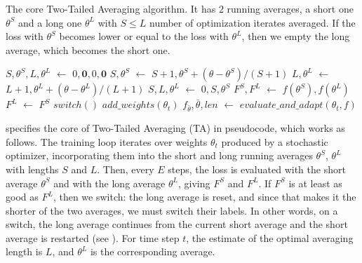 \documentclass[twocolumn]{article}
\newcommand*\Let[2]{\State #1 $\gets$ #2}
\newcommand{\tta}{\liningnums{2}TA}
\begin{document}
\begin{algorithm}[t]
  \caption[The core Two-Tailed Averaging algorithm, without extensions.]{\small The core Two-Tailed Averaging algorithm.
It has 2 running averages, a short one $\theta^S$ and a long one $\theta^L$ with $S \leq L$ number of optimization iterates averaged.
If the loss with $\theta^S$ becomes lower or equal to the loss with $\theta^L$, then we empty the long average, which becomes the short one.}
  \label{alg:two-tailed-averaging-core}
  \begin{algorithmic}[1]
    \Let{$S,\theta^S, L, \theta^L$} {$0, \mathbf{0}, 0, \mathbf{0}$}
    \State
      \Let{$S, \theta^S$}{$S+1,\theta^S + (\theta-\theta^S)/(S+1)$}
      \Let{$L, \theta^L$}{$L+1,\theta^L + (\theta-\theta^L)/(L+1)$}
    \EndProcedure
    \State
      \Let{$S, L,\theta^L$}{$0,S,\theta^S$}
    \EndProcedure
    \State
      \Let{$F^S,F^L$}{$f(\theta^S),f(\theta^L)$}
        \Let{$F^L$}{$F^S$}
        \State $switch()$
        \label{algo:line:switch}
      \EndIf
      \State {}
    \EndFunction
    \State
      \State $add\_weights(\theta_t)$
      \label{algo:line:beforeswitch}
        \Let{$f_{\bar{\theta}}, \bar{\theta}, len$}{$evaluate\_and\_adapt(\theta_t, f)$}
      \EndIf
    \EndFor
  \end{algorithmic}
\end{algorithm}

 specifies the core of Two-Tailed Averaging (\tta{}) in pseudocode, which works as follows.
The training loop iterates over weights $\theta_t$ produced by a stochastic optimizer, incorporating them into the short and long running averages $\theta^S$, $\theta^L$ with lengths $S$ and $L$.
Then, every $E$ steps, the loss is evaluated with the short average $\theta^S$ and with the long average $\theta^L$, giving $F^S$ and $F^L$.
If $F^S$ is at least as good as $F^L$, then we switch: the long average is reset,
and since that makes it the shorter of the two averages, we must switch their labels.
In other words, on a switch, the long average continues from the current short average and the short average is restarted (see ).
For time step $t$, the estimate of the optimal averaging length is $L$, and $\theta^L$ is the corresponding average.
\end{document}
